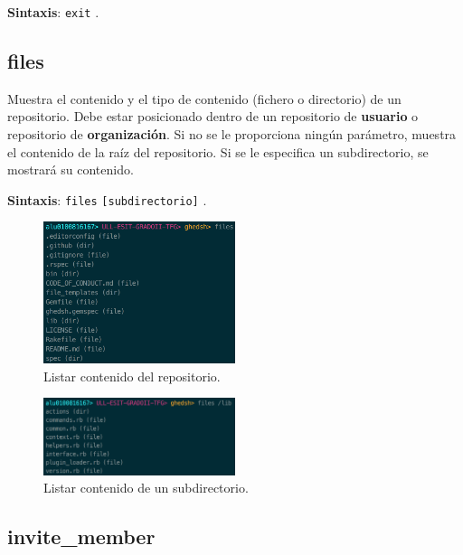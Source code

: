 \textbf{Sintaxis}: \verb|exit| .

\subsection{files}
\label{3.3.5}

Muestra el contenido y el tipo de contenido  (fichero o directorio) de un repositorio. Debe estar posicionado dentro de un repositorio de \textbf{usuario} o repositorio de \textbf{organización}.
Si no se le proporciona ningún parámetro, muestra el contenido de la raíz del repositorio. Si se le especifica un subdirectorio, se mostrará su contenido.

\textbf{Sintaxis}: \verb|files| \verb|[subdirectorio]| . 

\begin{figure}[H]
	\begin{center}
	\includegraphics[width=0.5\textwidth]{images/dir-content.png}
	\caption{Listar contenido del repositorio.}
	\label{fig:dir-content}
	\end{center}
\end{figure}

\begin{figure}[H]
	\begin{center}
	\includegraphics[width=0.5\textwidth]{images/subdir-content.png}
	\caption{Listar contenido de un subdirectorio.}
	\label{fig:subdir-content}
	\end{center}
\end{figure}

\subsection{invite\_member}
\label{3.3.6}

